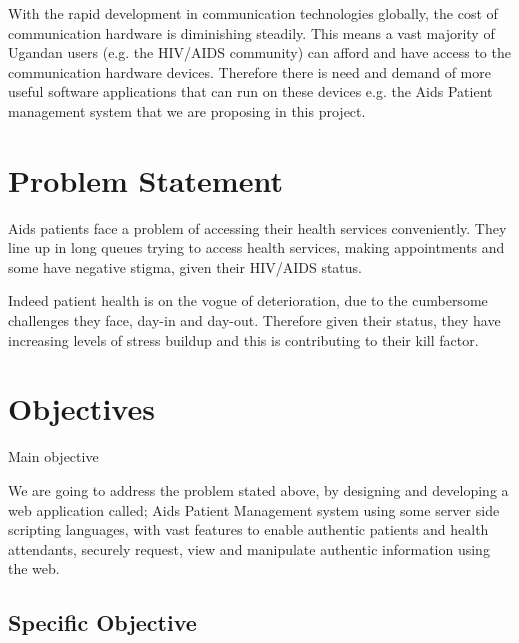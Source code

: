\documentclass[12pt]{article}
\begin{document}
With the rapid development in communication technologies globally, the cost of communication hardware is diminishing steadily. This means a vast majority of Ugandan users (e.g. the HIV/AIDS community) can afford and have access to the communication hardware devices. Therefore there is need and demand of more useful software applications that can run on these devices e.g. the Aids Patient management system that we are proposing in this project.\par

\section{Problem Statement}
Aids patients face a problem of accessing their health services conveniently. They line up in long queues trying to access health services, making appointments and some have negative stigma, given their HIV/AIDS status. \par

Indeed patient health is on the vogue of deterioration, due to the cumbersome challenges they face, day-in and day-out. Therefore given their status, they have increasing levels of stress buildup and this is contributing to their kill factor.\par

\section{Objectives}
Main objective\par

We are going to address the problem stated above, by designing and developing a web application called; Aids Patient Management system using some server side scripting languages, with vast features to enable authentic patients and health attendants, securely request, view and manipulate authentic information using the web. \par

\subsection{Specific Objective}
\end{document}
